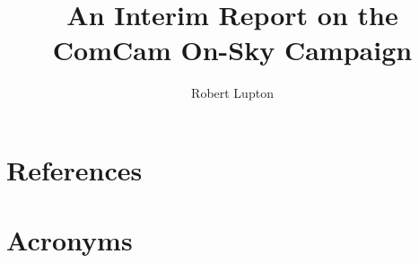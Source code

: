 \documentclass[SE,lsstdraft,authoryear,toc]{lsstdoc}
\title{An Interim Report on the ComCam On-Sky Campaign}
\author{%
Robert Lupton
}
\date{\vcsDate}
\begin{document}
\maketitle












































\appendix
\section{References} \label{sec:bib}
\renewcommand{\refname}{} %


\section{Acronyms} \label{sec:acronyms}

\end{document}
